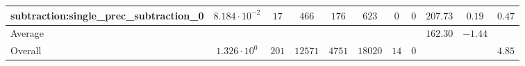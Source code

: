 \begin{tabular}{|l|c|c|c|c|c|c|c|c|c|c|}
subtraction:single\_prec\_subtraction\_0         & $ 8.184 \cdot 10^{-2} $ & $ 17     $ & $ 466   $ & $ 176  $ & $ 623   $ & $ 0  $ & $ 0 $ & $ 207.73      $ & $ 0.19    $ & $ 0.47    $ \\
\hline
Average                                          & $                     $ & $        $ & $       $ & $      $ & $       $ & $    $ & $   $ & $ 162.30      $ & $ -1.44   $ & $         $ \\
\hline
Overall                                          & $ 1.326 \cdot 10^{0}  $ & $ 201    $ & $ 12571 $ & $ 4751 $ & $ 18020 $ & $ 14 $ & $ 0 $ & $             $ & $         $ & $ 4.85    $ \\
\hline
\end{tabular}
